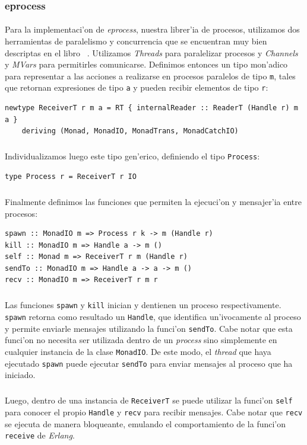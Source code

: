 \documentclass[a4paper]{article}
\begin{document}
\subsubsection{eprocess}
\paragraph{}Para la implementaci'on de \textsl{eprocess}, nuestra librer'ia de procesos, utilizamos dos herramientas de paralelismo y concurrencia que se encuentran muy bien descriptas en el libro ~\cite{realworldhaskell}.  Utilizamos \textsl{Threads} para paralelizar procesos y \textsl{Channels} y \textsl{MVars} para permitirles comunicarse.  Definimos entonces un tipo mon'adico para representar a las acciones a realizarse en procesos paralelos de tipo \texttt{m}, tales que retornan expresiones de tipo \texttt{a} y pueden recibir elementos de tipo \texttt{r}:
\begin{lstlisting}
newtype ReceiverT r m a = RT { internalReader :: ReaderT (Handle r) m a }
    deriving (Monad, MonadIO, MonadTrans, MonadCatchIO)
\end{lstlisting}
\subparagraph{}Individualizamos luego este tipo gen'erico, definiendo el tipo \texttt{Process}:
\begin{lstlisting}
type Process r = ReceiverT r IO
\end{lstlisting}
\subparagraph{}Finalmente definimos las funciones que permiten la ejecuci'on y mensajer'ia entre procesos:
\begin{lstlisting}
spawn :: MonadIO m => Process r k -> m (Handle r)
kill :: MonadIO m => Handle a -> m ()
self :: Monad m => ReceiverT r m (Handle r)
sendTo :: MonadIO m => Handle a -> a -> m ()
recv :: MonadIO m => ReceiverT r m r
\end{lstlisting}
\subparagraph{}Las funciones \texttt{spawn} y \texttt{kill} inician y dentienen un proceso respectivamente.  \texttt{spawn} retorna como resultado un \texttt{Handle}, que identifica un'ivocamente al proceso y permite enviarle mensajes utilizando la funci'on \texttt{sendTo}.  Cabe notar que esta funci'on no necesita ser utilizada dentro de un \textsl{process} sino simplemente en cualquier instancia de la clase \texttt{MonadIO}.  De este modo, el \textsl{thread} que haya ejecutado \texttt{spawn} puede ejecutar \texttt{sendTo} para enviar mensajes al proceso que ha iniciado.
\subparagraph{}Luego, dentro de una instancia de \texttt{ReceiverT} se puede utilizar la funci'on \texttt{self} para conocer el propio \texttt{Handle} y \texttt{recv} para recibir mensajes.  Cabe notar que \texttt{recv} se ejecuta de manera bloqueante, emulando el comportamiento de la funci'on \texttt{receive} de \textsl{Erlang}.
\end{document}
